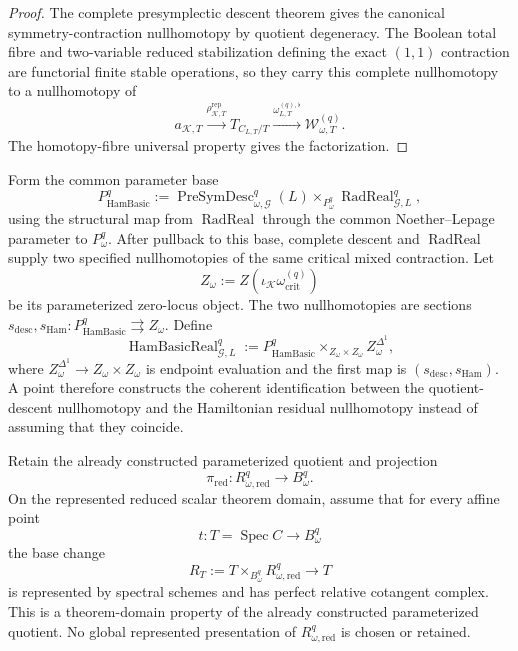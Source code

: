 \begin{proof}
The complete presymplectic descent theorem gives the canonical symmetry-contraction
nullhomotopy by quotient degeneracy.  The Boolean total fibre and two-variable
reduced stabilization defining the exact $(1,1)$ contraction are functorial finite
stable operations, so they carry this complete nullhomotopy to a nullhomotopy of
\[
a_{\mathcal K,T}
\xrightarrow{\rho_{\mathcal K,T}^{\mathrm{rep}}}
T_{C_{L,T}/T}
\xrightarrow{\omega_{L,T}^{(q),\flat}}
\mathcal W_{\omega,T}^{(q)}.
\]
The homotopy-fibre universal property gives the factorization.
\end{proof}

\begin{construction}
\label{constr:symmetry-noether-hamiltonian-descent-compatibility-locus}
Form the common parameter base
\[
P_{\mathrm{HamBasic}}^q
:=
\operatorname{PreSymDesc}_{\omega,\mathcal G}^{q}(L)
\times_{P_\omega^q}
\operatorname{RadReal}_{\mathcal G,L}^{q},
\]
using the structural map from $\operatorname{RadReal}$ through the common
Noether--Lepage parameter to $P_\omega^q$.  After pullback to this base, complete
descent and $\operatorname{RadReal}$ supply two specified nullhomotopies of the
same critical mixed contraction.  Let
\[
Z_\omega:=
Z\!\left(\iota_{\mathcal K}\omega_{\mathrm{crit}}^{(q)}\right)
\]
be its parameterized zero-locus object.  The two nullhomotopies are sections
$s_{\mathrm{desc}},s_{\mathrm{Ham}}:P_{\mathrm{HamBasic}}^q\rightrightarrows Z_\omega$.
Define
\[
\boxed{
\operatorname{HamBasicReal}_{\mathcal G,L}^{q}
:=
P_{\mathrm{HamBasic}}^q
\times_{Z_\omega\times Z_\omega}
Z_\omega^{\Delta^1},
}
\]
where $Z_\omega^{\Delta^1}\to Z_\omega\times Z_\omega$ is endpoint evaluation and
the first map is $(s_{\mathrm{desc}},s_{\mathrm{Ham}})$.  A point therefore
constructs the coherent identification between the quotient-descent nullhomotopy
and the Hamiltonian residual nullhomotopy instead of assuming that they coincide.
\end{construction}

\begin{convention}
\label{conv:symmetry-noether-affine-point-theorem-domain-for-reduced-first-order-geometry}
Retain the already constructed parameterized quotient and projection
\[
\pi_{\mathrm{red}}:
R_{\omega,\mathrm{red}}^{q}
\longrightarrow B_\omega^q.
\]
On the represented reduced scalar theorem domain, assume that for every affine
point
\[
t:T=\operatorname{Spec}C\longrightarrow B_\omega^q
\]
the base change
\[
R_T:=
T\times_{B_\omega^q}R_{\omega,\mathrm{red}}^{q}
\longrightarrow T
\]
is represented by spectral schemes and has perfect relative cotangent complex.
This is a theorem-domain property of the already constructed parameterized
quotient.  No global represented presentation of
$R_{\omega,\mathrm{red}}^{q}$ is chosen or retained.
\end{convention}


